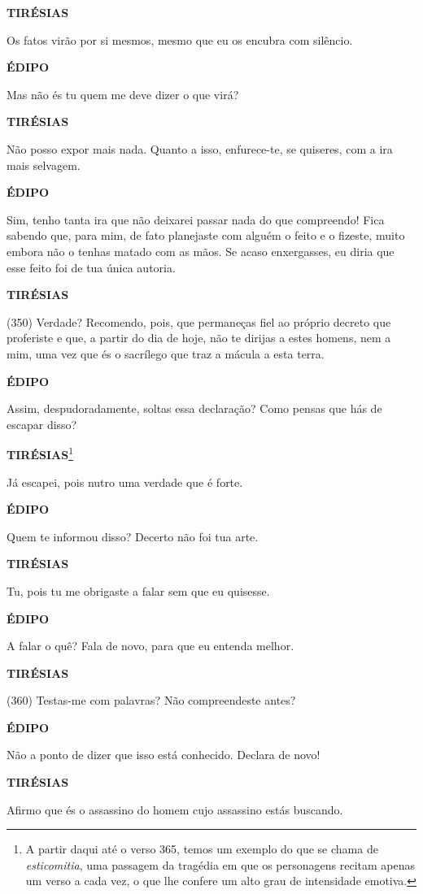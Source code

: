 \textbf{TIRÉSIAS}

Os fatos virão por si mesmos, mesmo que eu os encubra com silêncio.

\textbf{ÉDIPO}

Mas não és tu quem me deve dizer o que virá?

\textbf{TIRÉSIAS}

Não posso expor mais nada. Quanto a isso, enfurece-te, se quiseres, com
a ira mais selvagem.

\textbf{ÉDIPO}

Sim, tenho tanta ira que não deixarei passar nada do que compreendo!
Fica sabendo que, para mim, de fato planejaste com alguém o feito e o
fizeste, muito embora não o tenhas matado com as mãos. Se acaso
enxergasses, eu diria que esse feito foi de tua única autoria.

\textbf{TIRÉSIAS}

(350) Verdade? Recomendo, pois, que permaneças fiel ao próprio decreto
que proferiste e que, a partir do dia de hoje, não te dirijas a estes
homens, nem a mim, uma vez que és o sacrílego que traz a mácula a esta
terra.

\textbf{ÉDIPO}

Assim, despudoradamente, soltas essa declaração? Como pensas que hás de
escapar disso?

\textbf{TIRÉSIAS}\footnote{A partir daqui até o verso 365, temos um
  exemplo do que se chama de \emph{esticomitia}, uma passagem da
  tragédia em que os personagens recitam apenas um verso a cada vez, o
  que lhe confere um alto grau de intensidade emotiva.}

Já escapei, pois nutro uma verdade que é forte.

\textbf{ÉDIPO}

Quem te informou disso? Decerto não foi tua arte.

\textbf{TIRÉSIAS}

Tu, pois tu me obrigaste a falar sem que eu quisesse.

\textbf{ÉDIPO}

A falar o quê? Fala de novo, para que eu entenda melhor.

\textbf{TIRÉSIAS}

(360) Testas-me com palavras? Não compreendeste antes?

\textbf{ÉDIPO}

Não a ponto de dizer que isso está conhecido. Declara de novo!

\textbf{TIRÉSIAS}

Afirmo que és o assassino do homem cujo assassino estás buscando.

